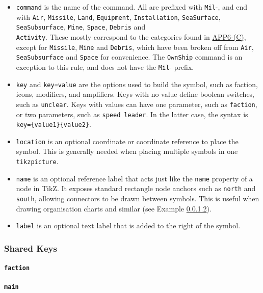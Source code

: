 \documentclass[a4paper, titlepage]{article}
\begin{document}
\begin{itemize}
\item \texttt{command} is the name of the command. All are prefixed with \texttt{Mil}-, and end with \texttt{Air}, \texttt{Missile}, \texttt{Land}, \texttt{Equipment}, \texttt{Installation}, \texttt{SeaSurface}, \texttt{SeaSubsurface}, \texttt{Mine}, \texttt{Space}, \texttt{Debris} and\\ \texttt{Activity}. These mostly correspond to the categories found in \href{https://www.awl.edu.pl/images/en/APP_6_C.pdf}{APP6-(C)}, except for \texttt{Missile}, \texttt{Mine} and \texttt{Debris}, which have been broken off from \texttt{Air}, \texttt{SeaSubsurface} and \texttt{Space} for convenience. The \texttt{OwnShip} command is an exception to this rule, and does not have the \texttt{Mil}- prefix.

\item \texttt{key} and \texttt{key=value} are the options used to build the symbol, such as faction, icons, modifiers, and amplifiers. Keys with no value define boolean switches, such as \texttt{unclear}. Keys with values can have one parameter, such as \texttt{faction}, or two parameters, such as \texttt{speed leader}. In the latter case, the syntax is \texttt{key=\{value1\}\{value2\}}.
\item \texttt{location} is an optional coordinate or coordinate reference to place the symbol. This is generally needed when placing multiple symbols in one \texttt{tikzpicture}.
\item \texttt{name} is an optional reference label that acts just like the \texttt{name} property of a node in TikZ. It exposes standard rectangle node anchors such as \texttt{north} and \texttt{south}, allowing connectors to be drawn between symbols. This is useful when drawing organisation charts and similar (see Example \ref{}).
\item \texttt{label} is an optional text label that is added to the right of the symbol.
\end{itemize}

\subsubsection{Shared Keys}

\paragraph{\texttt{faction}}

\paragraph{\texttt{main}}
\end{document}
